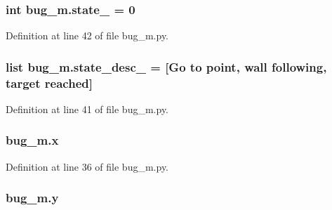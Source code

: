 \subsubsection[{\texorpdfstring{state\+\_\+}{state_}}]{\setlength{\rightskip}{0pt plus 5cm}int bug\+\_\+m.\+state\+\_\+ = 0}\hypertarget{namespacebug__m_a79dc362dff5bef439beacdd5c0c3b2f1}{}\label{namespacebug__m_a79dc362dff5bef439beacdd5c0c3b2f1}


Definition at line 42 of file bug\+\_\+m.\+py.

\subsubsection[{\texorpdfstring{state\+\_\+desc\+\_\+}{state_desc_}}]{\setlength{\rightskip}{0pt plus 5cm}list bug\+\_\+m.\+state\+\_\+desc\+\_\+ = \mbox{[}\textquotesingle{}Go to point\textquotesingle{}, \textquotesingle{}wall following\textquotesingle{}, \textquotesingle{}target reached\textquotesingle{}\mbox{]}}\hypertarget{namespacebug__m_ae70f71d3816862f72790fae7bfaa543b}{}\label{namespacebug__m_ae70f71d3816862f72790fae7bfaa543b}


Definition at line 41 of file bug\+\_\+m.\+py.

\subsubsection[{\texorpdfstring{x}{x}}]{\setlength{\rightskip}{0pt plus 5cm}bug\+\_\+m.\+x}\hypertarget{namespacebug__m_af10f89c7f929c9babce108f5d7382996}{}\label{namespacebug__m_af10f89c7f929c9babce108f5d7382996}


Definition at line 36 of file bug\+\_\+m.\+py.

\subsubsection[{\texorpdfstring{y}{y}}]{\setlength{\rightskip}{0pt plus 5cm}bug\+\_\+m.\+y}\hypertarget{namespacebug__m_ab8596d2ae799585b0d89152b55891aa8}{}\label{namespacebug__m_ab8596d2ae799585b0d89152b55891aa8}


